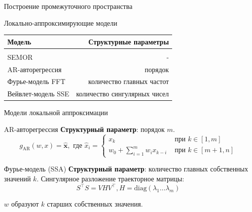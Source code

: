 \documentclass{beamer}
\newcommand{\bx}{\mathbf{x}}
\newcommand{\R}{\mathbb{R}}
\begin{document}


\begin{frame}{Построение промежуточного пространства}
    \begin{block}{Локально-аппроксимирующие модели}
    \begin{center}
        \begin{tabular}{| l | r |}
            Модель & Структурные параметры \\
            \hline \\
            SEMOR & - \\
            AR-авторегрессия & порядок \\
            Фурье-модель FFT & количество главных частот \\
            Вейвлет-модель SSE & количество сингулярных чисел\\
            \hline
            \end{tabular}
    \end{center}
    \end{block}
\end{frame}


\begin{frame}{Модели локальной аппроксимации}
    \begin{block}{AR-авторегрессия}
        \textbf{Структурный параметр}: порядок $m$.
        $$
        g_{\text{AR}}(w, x) = \hat{\bx}, \text{ где }
        \hat{x}_i = \begin{cases}
            x_k & \text{ при } k \in [1, m] \\
            w_0 + \sum_{i=1}^m w_i x_{k - i} & \text{ при } k \in [m + 1, n]
        \end{cases}
        $$
    \end{block}


\begin{block}{Фурье-модель (SSA)}
    \textbf{Структурный параметр}: количество главных собственных значений $k$.
    Сингулярное разложение траекторное матрицы:
    $$
    S^\intercal S = VHV^\intercal, H = \mathrm{diag}(\lambda_1 \ldots \lambda_m)
    $$

    $w$ образуют $k$ старших собственных значения.
\end{block}
\end{frame}
\end{document}

